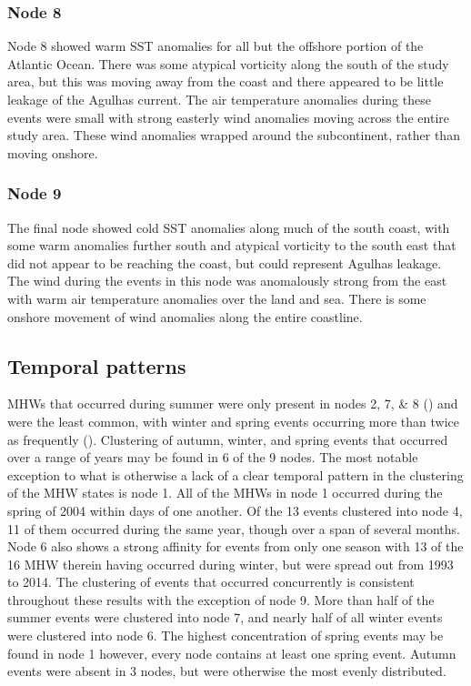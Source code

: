 \documentclass[a4paper,10pt,review]{elsarticle}
\begin{document}
\subsubsection{Node 8}
Node 8 showed warm SST anomalies for all but the offshore portion of the Atlantic Ocean. There was some atypical vorticity along the south of the study area, but this was moving away from the coast and there appeared to be little leakage of the Agulhas current. The air temperature anomalies during these events were small with strong easterly wind anomalies moving across the entire study area. These wind anomalies wrapped around the subcontinent, rather than moving onshore.

\subsubsection{Node 9}
The final node showed cold SST anomalies along much of the south coast, with some warm anomalies further south and atypical vorticity to the south east that did not appear to be reaching the coast, but could represent Agulhas leakage. The wind during the events in this node was anomalously strong from the east with warm air temperature anomalies over the land and sea. There is some onshore movement of wind anomalies along the entire coastline.

\subsection{Temporal patterns}
MHWs that occurred during summer were only present in nodes 2, 7, \& 8 () and were the least common, with winter and spring events occurring more than twice as frequently (). Clustering of autumn, winter, and spring events that occurred over a range of years may be found in 6 of the 9 nodes. The most notable exception to what is otherwise a lack of a clear temporal pattern in the clustering of the MHW states is node 1. All of the MHWs in node 1 occurred during the spring of 2004 within days of one another. Of the 13 events clustered into node 4, 11 of them occurred during the same year, though over a span of several months. Node 6 also shows a strong affinity for events from only one season with 13 of the 16 MHW therein having occurred during winter, but were spread out from 1993 to 2014. The clustering of events that occurred concurrently is consistent throughout these results with the exception of node 9. More than half of the summer events were clustered into node 7, and nearly half of all winter events were clustered into node 6. The highest concentration of spring events may be found in node 1 however, every node contains at least one spring event. Autumn events were absent in 3 nodes, but were otherwise the most evenly distributed.
\end{document}
